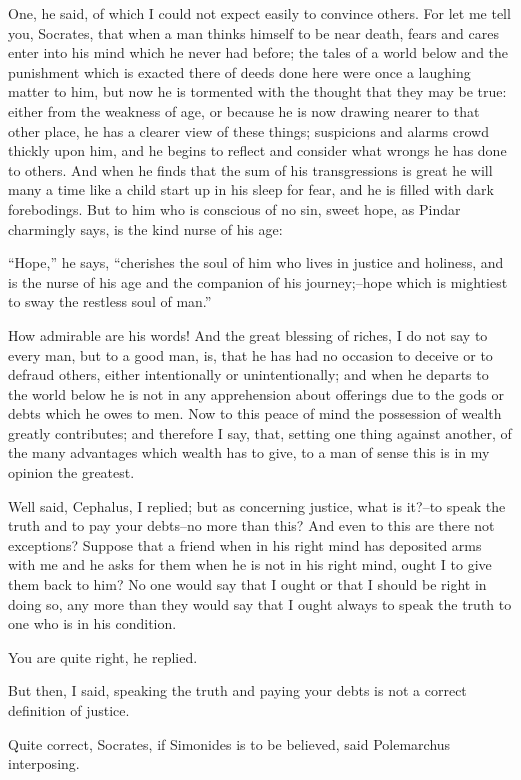 One, he said, of which I could not expect easily to convince others.
For let me tell you, Socrates, that when a man thinks himself to be near
death, fears and cares enter into his mind which he never had before;
the tales of a world below and the punishment which is exacted there
of deeds done here were once a laughing matter to him, but now he
is tormented with the thought that they may be true: either from the
weakness of age, or because he is now drawing nearer to that other
place, he has a clearer view of these things; suspicions and alarms
crowd thickly upon him, and he begins to reflect and consider what
wrongs he has done to others. And when he finds that the sum of his
transgressions is great he will many a time like a child start up in his
sleep for fear, and he is filled with dark forebodings. But to him who
is conscious of no sin, sweet hope, as Pindar charmingly says, is the
kind nurse of his age:

``Hope,'' he says, ``cherishes the soul of him who lives in justice
and holiness, and is the nurse of his age and the companion of his
journey;--hope which is mightiest to sway the restless soul of man.''

How admirable are his words! And the great blessing of riches, I do not
say to every man, but to a good man, is, that he has had no occasion to
deceive or to defraud others, either intentionally or unintentionally;
and when he departs to the world below he is not in any apprehension
about offerings due to the gods or debts which he owes to men. Now to
this peace of mind the possession of wealth greatly contributes; and
therefore I say, that, setting one thing against another, of the many
advantages which wealth has to give, to a man of sense this is in my
opinion the greatest.

Well said, Cephalus, I replied; but as concerning justice, what is
it?--to speak the truth and to pay your debts--no more than this? And
even to this are there not exceptions? Suppose that a friend when in his
right mind has deposited arms with me and he asks for them when he is
not in his right mind, ought I to give them back to him? No one would
say that I ought or that I should be right in doing so, any more than
they would say that I ought always to speak the truth to one who is in
his condition.

You are quite right, he replied.

But then, I said, speaking the truth and paying your debts is not a
correct definition of justice.

Quite correct, Socrates, if Simonides is to be believed, said
Polemarchus interposing.

